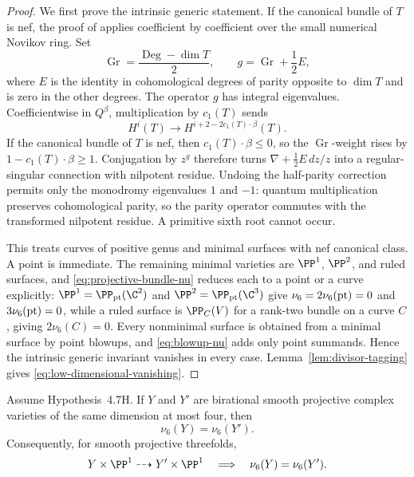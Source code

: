 \begin{proof}
We first prove the intrinsic generic statement.  If the canonical bundle of
\(T\) is nef, the proof
of \cite[Claim~6.15]{KKPYY} applies coefficient by coefficient over the small
numerical Novikov ring.  Set
\[
 \operatorname{Gr}=\frac{\operatorname{Deg}-\dim T}{2},
 \qquad g=\operatorname{Gr}+\frac12E,
\]
where \(E\) is the identity in cohomological degrees of parity opposite to
\(\dim T\) and is zero in the other degrees.  The operator \(g\) has integral
eigenvalues.  Coefficientwise in \(Q^\beta\), multiplication by \(c_1(T)\)
sends
\[
 H^i(T)\longrightarrow H^{i+2-2c_1(T)\cdot\beta}(T).
\]
If the canonical bundle of \(T\) is nef, then \(c_1(T)\cdot\beta\le0\), so the
\(\operatorname{Gr}\)-weight rises by
\(1-c_1(T)\cdot\beta\ge1\).
Conjugation by \(z^g\) therefore turns
\(
 \nabla+\frac12E\,dz/z
\)
into a regular-singular connection with nilpotent residue.  Undoing the
half-parity correction permits only the monodromy eigenvalues \(1\) and
\(-1\): quantum multiplication preserves cohomological parity, so the parity
operator commutes with the transformed nilpotent residue.  A primitive sixth
root cannot occur.

This treats curves of positive genus and minimal surfaces with nef canonical
class.  A point is immediate.  The remaining minimal varieties are
\(\PP^1\), \(\PP^2\), and ruled surfaces, and
\eqref{eq:projective-bundle-nu} reduces each to a point or a curve
explicitly: \(\PP^1=\PP_{\rm pt}(\C^2)\) and \(\PP^2=\PP_{\rm pt}(\C^3)\)
give \(\nu_6=2\nu_6({\rm pt})=0\) and \(3\nu_6({\rm pt})=0\), while a ruled
surface is \(\PP_C(V)\) for a rank-two bundle on a curve \(C\), giving
\(2\nu_6(C)=0\).  Every nonminimal surface is obtained from a minimal surface by point
blowups, and \eqref{eq:blowup-nu} adds only point summands.  Hence the
intrinsic generic invariant vanishes in every case.
Lemma~\ref{lem:divisor-tagging} gives
\eqref{eq:low-dimensional-vanishing}.
\end{proof}

\begin{theorem}
\label{thm:nu6-birational-invariance}
Assume Hypothesis~4.7H.
If \(Y\) and \(Y'\) are birational smooth projective complex varieties of
the same dimension at most four, then
\[
 \nu_6(Y)=\nu_6(Y').
 \tag{4.8}
 \label{eq:nu-birational-invariance}
\]
Consequently, for smooth projective threefolds,
\[
 Y\times\PP^1\dashrightarrow Y'\times\PP^1
 \quad\Longrightarrow\quad \nu_6(Y)=\nu_6(Y').
\]
\end{theorem}

